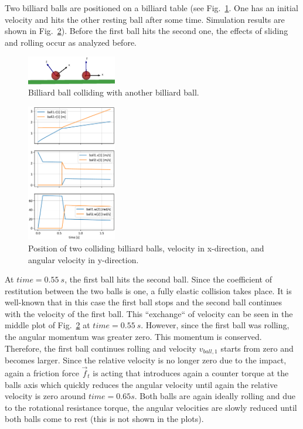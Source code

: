 Two billiard balls are positioned on a billiard table (see Fig.~\ref{fig:twoCollidingBalls}.
One has an initial velocity and hits the other resting ball after some time.
Simulation results are shown in Fig.~\ref{fig:twoCollidingBalls_plot}).
Before the first ball hits the second one, the
effects of sliding and rolling occur as analyzed before.
%
\begin{figure}[b]
	\centering
	\includegraphics[width=0.35\textwidth]{figures/twoCollidingBalls.png}
	\caption{Billiard ball colliding with another billiard ball.}
	\label{fig:twoCollidingBalls}
\end{figure}
%
\begin{figure}[t]
	\centering
	\includegraphics[width=0.35\textwidth]{figures/twoCollidingBalls_plot.pdf}
	\caption{Position of two colliding billiard balls, velocity in x-direction, and angular velocity in y-direction.}
	\label{fig:twoCollidingBalls_plot}
\end{figure}
%
At $time = 0.55~s$, the first ball hits the second ball. Since the coefficient of restitution between the
two balls is one, a fully elastic collision takes place. It is well-known that in this case the first ball
stops and the second ball continues with the velocity of the first ball. This ``exchange`` of velocity
can be seen in the middle plot of Fig.~\ref{fig:twoCollidingBalls_plot} at $time = 0.55~s$. However, since the first ball
was rolling, the angular momentum was greater zero. This momentum is conserved. Therefore, the first ball continues rolling
and velocity $v_{ball,1}$ starts from zero and becomes larger.
Since the relative velocity is no longer zero due to the impact, again a friction force $\vec{f}_t$ is acting
that introduces again a counter torque at the balls axis which quickly reduces the angular velocity until again
the relative velocity is zero around $time = 0.65 s$. Both balls are again ideally rolling and due to the
rotational resistance torque, the angular velocities are slowly reduced until both balls come to rest
(this is not shown in the plots).
%



